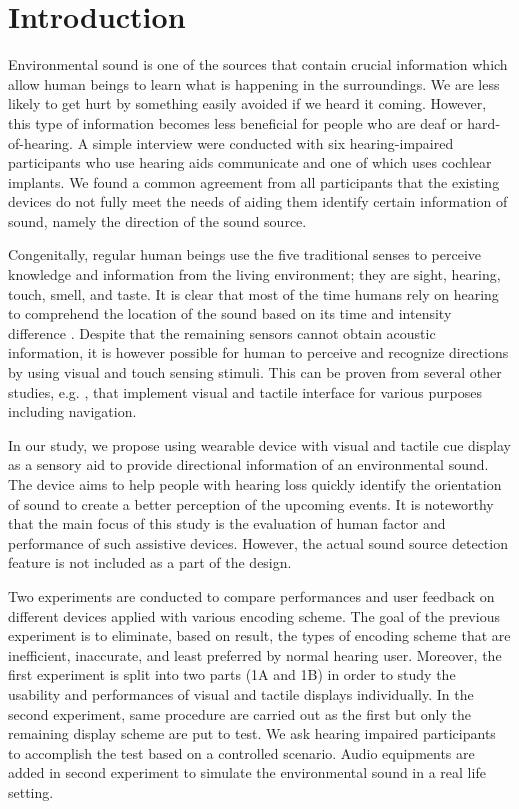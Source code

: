 \documentclass{sigchi}
\begin{document}
\section{Introduction}
Environmental sound is one of the sources that contain crucial information which allow human beings to learn what is happening in the surroundings. We are less likely to get hurt by something easily avoided if we heard it coming. However, this type of information becomes less beneficial for people who are deaf or hard-of-hearing. A simple interview were conducted with six hearing-impaired participants who use hearing aids communicate and one of which uses cochlear implants. We found a common agreement from all participants that the existing devices do not fully meet the needs of aiding them identify certain information of sound, namely the direction of the sound source.

Congenitally, regular human beings use the five traditional senses to perceive knowledge and information from the living environment; they are sight, hearing, touch, smell, and taste. It is clear that most of the time humans rely on hearing to comprehend the location of the sound based on its time and intensity difference \cite{Wallach1939}. Despite that the remaining sensors cannot obtain acoustic information, it is however possible for human to perceive and recognize directions by using visual and touch sensing stimuli. This can be proven from several other studies, e.g. \cite{Borg,Ho-Ching2003,Tsukada2004}, that implement visual and tactile interface for various purposes including navigation.

In our study, we propose using wearable device with visual and tactile cue display as a sensory aid to provide directional information of an environmental sound. The device aims to help people with hearing loss quickly identify the orientation of sound to create a better perception of the upcoming events. It is noteworthy that the main focus of this study is the evaluation of human factor and performance of such assistive devices. However, the actual sound source detection feature is not included as a part of the design.

Two experiments are conducted to compare performances and user feedback on different devices applied with various encoding scheme. The goal of the previous experiment is to eliminate, based on result, the types of encoding scheme that are inefficient, inaccurate, and least preferred by normal hearing user. Moreover, the first experiment is split into two parts (1A and 1B) in order to study the usability and performances of visual and tactile displays individually. In the second experiment, same procedure are carried out as the first but only the remaining display scheme are put to test. We ask hearing impaired participants to accomplish the test based on a controlled scenario. Audio equipments are added in second experiment to simulate the environmental sound in a real life setting.
\end{document}
